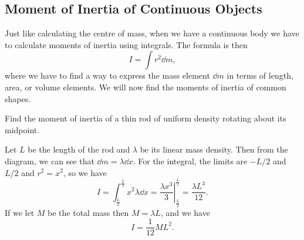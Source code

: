 \documentclass[../classical_mechanics.tex]{subfiles}
\begin{document}
        \subsection{Moment of Inertia of Continuous Objects}\label{subsec:moment-of-inertia-of-continuous-objects}
            Just like calculating the centre of mass, when we have a continuous body we have to calculate moments of inertia using integrals.
            The formula is then
            \begin{equation}
                I=\int r^2\dd{m},
            \end{equation}
            where we have to find a way to express the mass element $\dd{m}$ in terms of length, area, or volume elements. 
            We will now find the moments of inertia of common shapes.
            \begin{example}
                Find the moment of inertia of a thin rod of uniform density rotating about its midpoint.
                        

                Let $L$ be the length of the rod and $\lambda$ be its linear mass density.
                Then from the diagram, we can see that $\dd{m}=\lambda\dd{x}$.
                For the integral, the limits are $-L/2$ and $L/2$ and $r^2=x^2$, so we have
                \begin{equation}
                    I=\int_{\frac{L}{2}}^{\frac{L}{2}}x^2\lambda\dd{x}=\left.\frac{\lambda x^3}{3}\right|_{\frac{L}{2}}^{\frac{L}{2}}=\frac{\lambda L^3}{12}.
                \end{equation}
                If we let $M$ be the total mass then $M=\lambda L$, and we have
                \begin{equation}
                    I=\frac{1}{12}ML^2.
                \end{equation}
            \end{example}
\end{document}
